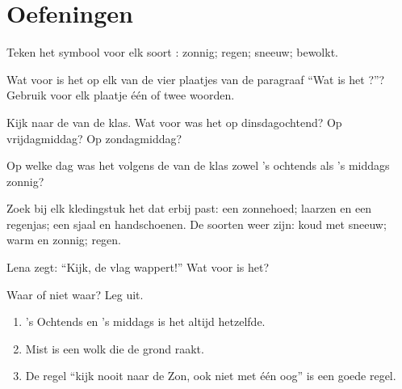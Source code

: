 \section{Oefeningen}

\begin{exercise}[$\star$]\label{exo:g1:watching-the-weather:1}
Teken het symbool voor elk soort : zonnig; regen; sneeuw; bewolkt.
\end{exercise}

\begin{exercise}[$\star$]\label{exo:g1:watching-the-weather:2}
Wat voor  is het op elk van de vier plaatjes van de paragraaf ``Wat is
het ?''? Gebruik voor elk plaatje één of twee woorden.
\end{exercise}

\begin{exercise}[$\star$]\label{exo:g1:watching-the-weather:3}
Kijk naar de  van de klas. Wat voor  was het op
dinsdagochtend? Op vrijdagmiddag? Op zondagmiddag?
\end{exercise}

\begin{exercise}[$\star$]\label{exo:g1:watching-the-weather:4}
Op welke dag was het volgens de  van de klas zowel 's ochtends
als 's middags zonnig?
\end{exercise}

\begin{exercise}[$\star$]\label{exo:g1:watching-the-weather:5}
Zoek bij elk kledingstuk het  dat erbij past: een zonnehoed; laarzen
en een regenjas; een sjaal en handschoenen. De soorten weer zijn: koud met
sneeuw; warm en zonnig; regen.
\end{exercise}

\begin{exercise}[$\star$]\label{exo:g1:watching-the-weather:6}
Lena zegt: ``Kijk, de vlag wappert!'' Wat voor  is het?
\end{exercise}

\begin{exercise}[$\star$]\label{exo:g1:watching-the-weather:7}
Waar of niet waar? Leg uit.
\begin{enumerate}
  \item 's Ochtends en 's middags is het  altijd hetzelfde.
  \item Mist is een wolk die de grond raakt.
  \item De regel ``kijk nooit naar de Zon, ook niet met één oog'' is een goede regel.
\end{enumerate}
\end{exercise}

